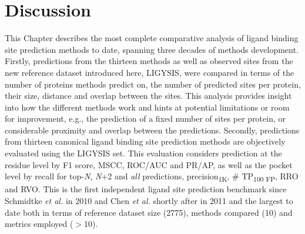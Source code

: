 \begin{longtable}[c]{|c|c|c|c|c|}
\label{tab:residue_level_benchmark}\\
\end{longtable}

\vspace{-12pt} %
\vspace{-12pt} %

\section{Discussion}

This Chapter describes the most complete comparative analysis of ligand binding site prediction methods to date, spanning three decades of methods development. Firstly, predictions from the thirteen methods as well as observed sites from the new reference dataset introduced here, LIGYSIS, were compared in terms of the number of proteins methods predict on, the number of predicted sites per protein, their size, distance and overlap between the sites. This analysis provides insight into how the different methods work and hints at potential limitations or room for improvement, e.g., the prediction of a fixed number of sites per protein, or considerable proximity and overlap between the predictions. Secondly, predictions from thirteen canonical ligand binding site prediction methods are objectively evaluated using the LIGYSIS set. This evaluation considers prediction at the residue level by F1 score, MSCC, ROC/AUC and PR/AP, as well as the pocket level by recall for top-\textit{N}, \textit{N}+2 and \textit{all} predictions, precision\textsubscript{1K}, \# TP\textsubscript{100 FP}, RRO and RVO. This is the first independent ligand site prediction benchmark since Schmidtke \textit{et al.} \cite{SCHMIDTKE_2010_BENCHMARK} in 2010 and Chen \textit{et al.} \cite{CHEN_2011_ASSESSMENT} shortly after in 2011 and the largest to date both in terms of reference dataset size (2775), methods compared (10) and metrics employed ($>$10).

